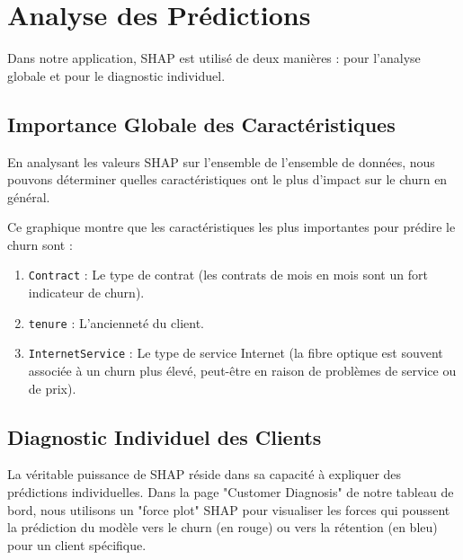 \section{Analyse des Prédictions}
Dans notre application, SHAP est utilisé de deux manières : pour l'analyse globale et pour le diagnostic individuel.

\subsection{Importance Globale des Caractéristiques}
En analysant les valeurs SHAP sur l'ensemble de l'ensemble de données, nous pouvons déterminer quelles caractéristiques ont le plus d'impact sur le churn en général.


Ce graphique montre que les caractéristiques les plus importantes pour prédire le churn sont :
\begin{enumerate}
    \item \texttt{Contract} : Le type de contrat (les contrats de mois en mois sont un fort indicateur de churn).
    \item \texttt{tenure} : L'ancienneté du client.
    \item \texttt{InternetService} : Le type de service Internet (la fibre optique est souvent associée à un churn plus élevé, peut-être en raison de problèmes de service ou de prix).
\end{enumerate}

\subsection{Diagnostic Individuel des Clients}
La véritable puissance de SHAP réside dans sa capacité à expliquer des prédictions individuelles. Dans la page "Customer Diagnosis" de notre tableau de bord, nous utilisons un "force plot" SHAP pour visualiser les forces qui poussent la prédiction du modèle vers le churn (en rouge) ou vers la rétention (en bleu) pour un client spécifique.


